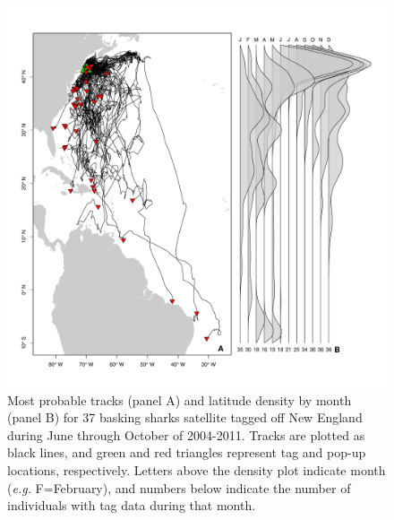 \begin{figure}[t!]
\centering
\includegraphics[width=.8\textwidth]{images/C3_Fig2.pdf}
\caption[Most probable basking shark tracks]{Most probable tracks (panel A) and latitude density by month (panel B) for 37 basking sharks satellite tagged off New England during June through October of 2004-2011. Tracks are plotted as black lines, and green and red triangles represent tag and pop-up locations, respectively. Letters above the density plot indicate month (\emph{e.g.} F=February), and numbers below indicate the number of individuals with tag data during that month.}
\label{fig:c3f2}
\end{figure}

